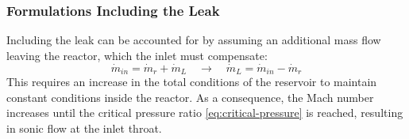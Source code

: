 \subsubsection*{Formulations Including the Leak}
	Including the leak can be accounted for by assuming an additional mass flow leaving the reactor, which the inlet must compensate:
	\begin{equation}
	    \dot{m}_{in} = \dot{m}_r + \dot{m}_L 
	    \quad \rightarrow \quad 
	    \dot{m}_L = \dot{m}_{in} - \dot{m}_r \label{eq:massflow-leak}
	\end{equation}
	This requires an increase in the total conditions of the reservoir to maintain constant conditions inside the reactor.
	As a consequence, the Mach number increases until the critical pressure ratio \eqref{eq:critical-pressure} is reached, resulting in sonic flow at the inlet throat.

